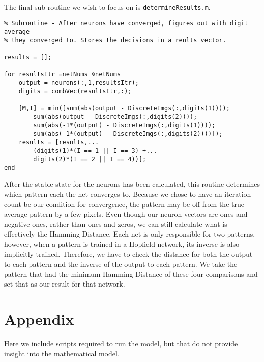 \documentclass[]{article}
\theoremstyle{plain}
\theoremstyle{definition}
\begin{document}
The final sub-routine we wish to focus on is \texttt{determineResults.m}.
\singlespacing
\begin{verbatim}
% Subroutine - After neurons have converged, figures out with digit average
% they converged to. Stores the decisions in a reults vector. 

results = []; 

for resultsItr =netNums %netNums
    output = neurons(:,1,resultsItr);
    digits = combVec(resultsItr,:);

    [M,I] = min([sum(abs(output - DiscreteImgs(:,digits(1))));
        sum(abs(output - DiscreteImgs(:,digits(2))));
        sum(abs(-1*(output) - DiscreteImgs(:,digits(1))));
        sum(abs(-1*(output) - DiscreteImgs(:,digits(2))))]);
    results = [results,...
        (digits(1)*(I == 1 || I == 3) +...
        digits(2)*(I == 2 || I == 4))]; 
end
\end{verbatim}
\doublespacing
\quad After the stable state for the neurons has been calculated, this routine determines which pattern each the net converges to. Because we chose to have an iteration count be our condition for convergence, the pattern may be off from the true average pattern by a few pixels. Even though our neuron vectors are ones and negative ones, rather than ones and zeros, we can still calculate what is effectively the Hamming Distance. Each net is only responsible for two patterns, however, when a pattern is trained in a Hopfield network, its inverse is also implicitly trained. Therefore, we have to check the distance for both the output to each pattern and the inverse of the output to each pattern. We take the pattern that had the minimum Hamming Distance of these four comparisons and set that as our result for that network. 

\newpage

\section{Appendix}
Here we include scripts required to run the model, but that do not provide insight into the mathematical model. 
\end{document}
